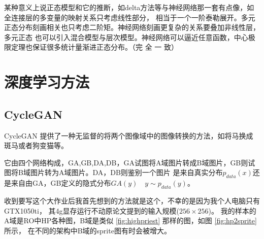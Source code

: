 \documentclass[twocolumn,11pt]{ctexart}
\begin{document}
某种意义上说正态模型和它的推断，如delta方法等与神经网络那一套有点像，如全连接层的多变量的映射关系只考虑线性部分，
相当于一个一阶泰勒展开。多元正态分布刻画相关也只考虑二阶矩。神经网络刻画更复杂的关系要叠加非线性层，多元正态
也可以引入混合模型与层次模型。神经网络可以逼近任意函数，中心极限定理也保证很多统计量渐进正态分布。（完 全 一 致）

\section{深度学习方法}

\subsection{CycleGAN}

CycleGAN \cite{zhu2017unpaired} 提供了一种无监督的将两个图像域中的图像转换的方法，如将马换成斑马或者狗变猫等。

它由四个网络构成，GA,GB,DA,DB，GA试图将A域图片转成B域图片，GB则试图将B域图片转为A域图片。DA，DB则鉴别一个图片
是来自真实分布$p_{data}(x)$还是来自由GA，GB定义的隐式分布$GA(y) \quad y \sim p_{data}(y)$。

收到要写这个大作业后我首先想到的方法就是这个，不幸的是因为我个人电脑只有GTX1050ti，
其4g显存运行不动原论文提到的输入规模($256\times256$)。
我的样本的A域是RO中HP各种图，B域是类似 \ref{fig:highpriest} 那样的图，如图 \ref{fig:hp2sprite} 所示，
在不同的架构中B域的sprite图有时会被增大。
\end{document}
